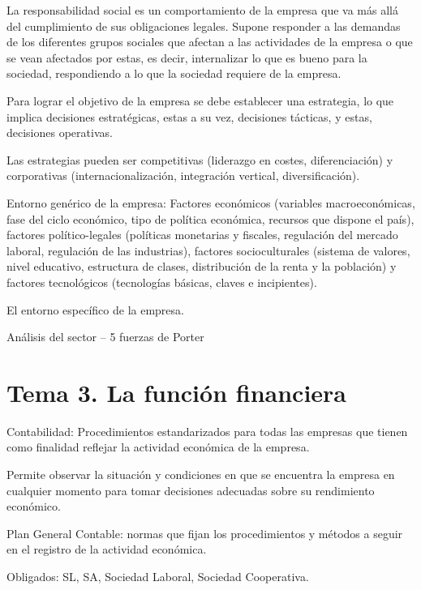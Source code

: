 \documentclass[12pt, twoside, openright]{report} %
\begin{document}
La responsabilidad social es un comportamiento de la empresa que va más allá del cumplimiento de sus
obligaciones legales. Supone responder a las demandas de los diferentes grupos sociales que afectan a las
actividades de la empresa o que se vean afectados por estas, es decir, internalizar lo que es bueno para la
sociedad, respondiendo a lo que la sociedad requiere de la empresa.

Para lograr el objetivo de la empresa se debe establecer una estrategia, lo que implica decisiones
estratégicas, estas a su vez, decisiones tácticas, y estas, decisiones operativas.

Las estrategias pueden ser competitivas (liderazgo en costes, diferenciación) y corporativas
(internacionalización, integración vertical, diversificación).

Entorno genérico de la empresa: Factores económicos (variables macroeconómicas, fase del ciclo
económico, tipo de política económica, recursos que dispone el país), factores político-legales (políticas
monetarias y fiscales, regulación del mercado laboral, regulación de las industrias), factores socioculturales
(sistema de valores, nivel educativo, estructura de clases, distribución de la renta y la población) y factores
tecnológicos (tecnologías básicas, claves e incipientes).

El entorno específico de la empresa.

Análisis del sector – 5 fuerzas de Porter
\begin{figure}[H]
	{\def\svgwidth{.9\textwidth}
		}
\end{figure}


\chapter{Tema 3. La función financiera}
Contabilidad: Procedimientos estandarizados para todas las empresas que tienen como finalidad reflejar la
actividad económica de la empresa.

Permite observar la situación y condiciones en que se encuentra la empresa en cualquier momento para
tomar decisiones adecuadas sobre su rendimiento económico.

Plan General Contable: normas que fijan los procedimientos y métodos a seguir en el registro de la actividad
económica.

Obligados: SL, SA, Sociedad Laboral, Sociedad Cooperativa.
\end{document}
